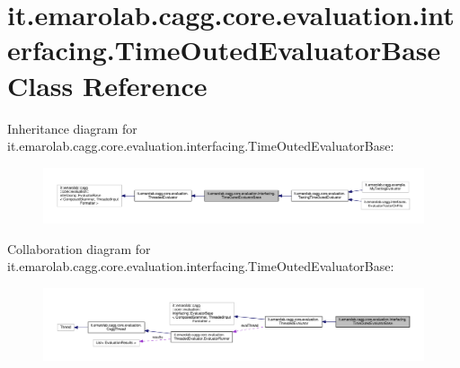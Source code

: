 \hypertarget{classit_1_1emarolab_1_1cagg_1_1core_1_1evaluation_1_1interfacing_1_1TimeOutedEvaluatorBase}{\section{it.\-emarolab.\-cagg.\-core.\-evaluation.\-interfacing.\-Time\-Outed\-Evaluator\-Base Class Reference}
\label{classit_1_1emarolab_1_1cagg_1_1core_1_1evaluation_1_1interfacing_1_1TimeOutedEvaluatorBase}
}


Inheritance diagram for it.\-emarolab.\-cagg.\-core.\-evaluation.\-interfacing.\-Time\-Outed\-Evaluator\-Base\-:\nopagebreak
\begin{figure}[H]
\begin{center}
\leavevmode
\includegraphics[width=350pt]{classit_1_1emarolab_1_1cagg_1_1core_1_1evaluation_1_1interfacing_1_1TimeOutedEvaluatorBase__inherit__graph}
\end{center}
\end{figure}


Collaboration diagram for it.\-emarolab.\-cagg.\-core.\-evaluation.\-interfacing.\-Time\-Outed\-Evaluator\-Base\-:\nopagebreak
\begin{figure}[H]
\begin{center}
\leavevmode
\includegraphics[width=350pt]{classit_1_1emarolab_1_1cagg_1_1core_1_1evaluation_1_1interfacing_1_1TimeOutedEvaluatorBase__coll__graph}
\end{center}
\end{figure}

